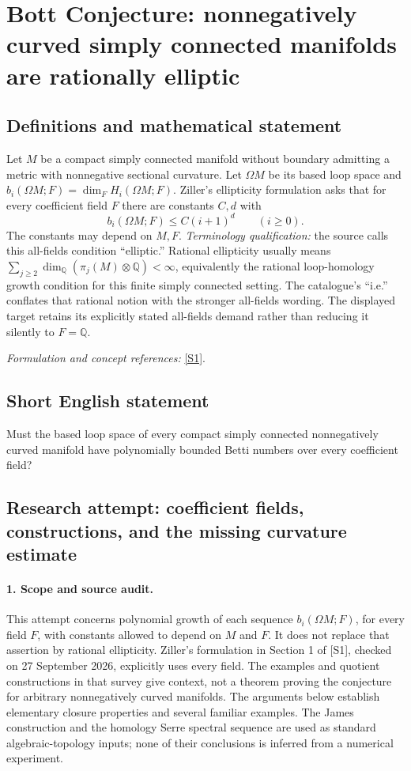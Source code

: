 \documentclass[11pt]{article}
\begin{document}
\section*{\texorpdfstring{Bott Conjecture: nonnegatively curved simply connected manifolds are rationally elliptic}{Bott Conjecture: nonnegatively curved simply connected manifolds are rationally elliptic}}\label{348}
\subsection{Definitions and mathematical statement}
Let $M$ be a compact simply connected manifold without boundary admitting a metric with nonnegative sectional curvature. Let $\Omega M$ be its based loop space and $b_i(\Omega M;F)=\dim_F H_i(\Omega M;F)$. Ziller's ellipticity formulation asks that for every coefficient field $F$ there are constants $C,d$ with
\[
 b_i(\Omega M;F)\le C(i+1)^d\qquad(i\ge0).
\]
The constants may depend on $M,F$. \emph{Terminology qualification:} the source calls this all-fields condition ``elliptic.'' Rational ellipticity usually means $\sum_{j\ge2}\dim_{{\mathbb{Q}}}(\pi_j(M)\otimes{\mathbb{Q}})<\infty$, equivalently the rational loop-homology growth condition for this finite simply connected setting. The catalogue's ``i.e.'' conflates that rational notion with the stronger all-fields wording. The displayed target retains its explicitly stated all-fields demand rather than reducing it silently to $F={\mathbb{Q}}$.
\par\smallskip\textit{Formulation and concept references:} \href{https://arxiv.org/html/math/0701389v3}{[S1]}.

\subsection{Short English statement}
Must the based loop space of every compact simply connected nonnegatively curved manifold have polynomially bounded Betti numbers over every coefficient field?
\subsection{Research attempt: coefficient fields, constructions, and the missing curvature estimate}
\paragraph{1. Scope and source audit.}
This attempt concerns polynomial growth of each sequence $b_i(\Omega M;F)$, for every field $F$, with constants allowed to depend on $M$ and $F$. It does not replace that assertion by rational ellipticity. Ziller's formulation in Section 1 of [S1], checked on 27 September 2026, explicitly uses every field. The examples and quotient constructions in that survey give context, not a theorem proving the conjecture for arbitrary nonnegatively curved manifolds. The arguments below establish elementary closure properties and several familiar examples. The James construction and the homology Serre spectral sequence are used as standard algebraic-topology inputs; none of their conclusions is inferred from a numerical experiment.
\end{document}

